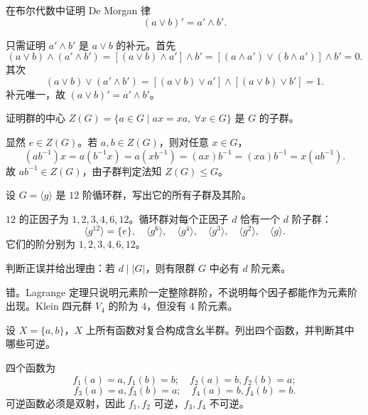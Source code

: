 \begin{exercise}[level=standard]
在布尔代数中证明 De Morgan 律
  \[
  (a\vee b)'=a'\wedge b'.
  \]
\begin{solution}
只需证明 $a'\wedge b'$ 是 $a\vee b$ 的补元。首先
  \[
  (a\vee b)\wedge(a'\wedge b')
  =[(a\vee b)\wedge a']\wedge b'
  =[(a\wedge a')\vee(b\wedge a')]\wedge b'=0.
  \]
  其次
  \[
  (a\vee b)\vee(a'\wedge b')
  =[(a\vee b)\vee a']\wedge[(a\vee b)\vee b']=1.
  \]
  补元唯一，故 $(a\vee b)'=a'\wedge b'$。
\end{solution}
\end{exercise}

\begin{exercise}[level=standard]
证明群的中心 $Z(G)=\{a\in G\mid ax=xa,\ \forall x\in G\}$ 是 $G$ 的子群。
\begin{solution}
显然 $e\in Z(G)$。若 $a,b\in Z(G)$，则对任意 $x\in G$，
  \[
  (ab^{-1})x=a(b^{-1}x)=a(xb^{-1})=(ax)b^{-1}=(xa)b^{-1}=x(ab^{-1}).
  \]
  故 $ab^{-1}\in Z(G)$，由子群判定法知 $Z(G)\le G$。
\end{solution}
\end{exercise}

\begin{exercise}[level=standard]
设 $G=\langle g\rangle$ 是 $12$ 阶循环群，写出它的所有子群及其阶。
\begin{solution}
$12$ 的正因子为 $1,2,3,4,6,12$。循环群对每个正因子 $d$ 恰有一个 $d$ 阶子群：
  \[
  \langle g^{12}\rangle=\{e\},\quad
  \langle g^6\rangle,\quad
  \langle g^4\rangle,\quad
  \langle g^3\rangle,\quad
  \langle g^2\rangle,\quad
  \langle g\rangle.
  \]
  它们的阶分别为 $1,2,3,4,6,12$。
\end{solution}
\end{exercise}

\begin{exercise}[level=advanced]
判断正误并给出理由：若 $d\mid |G|$，则有限群 $G$ 中必有 $d$ 阶元素。
\begin{solution}
错。Lagrange 定理只说明元素阶一定整除群阶，不说明每个因子都能作为元素阶出现。Klein 四元群 $V_4$ 的阶为 $4$，但没有 $4$ 阶元素。
\end{solution}
\end{exercise}

\begin{exercise}[level=advanced]
设 $X=\{a,b\}$，$X$ 上所有函数对复合构成含幺半群。列出四个函数，并判断其中哪些可逆。
\begin{solution}
四个函数为
  \[
  f_1(a)=a,f_1(b)=b;\quad f_2(a)=b,f_2(b)=a;
  \]
  \[
  f_3(a)=a,f_3(b)=a;\quad f_4(a)=b,f_4(b)=b.
  \]
  可逆函数必须是双射，因此 $f_1,f_2$ 可逆，$f_3,f_4$ 不可逆。
\end{solution}
\end{exercise}

